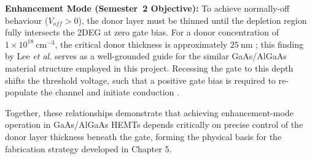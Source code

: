 \vspace{2mm}

\textbf{Enhancement Mode (Semester~2 Objective):}  
To achieve normally-off behaviour ($V_{off} > 0$), the donor layer must
be thinned until the depletion region fully intersects the 2DEG at zero
gate bias. For a donor concentration of \(1\times 10^{18}~\text{cm}^{-3}\), 
the critical donor thickness is approximately \(25~\text{nm}\) \cite{ivcv-hemt}; 
this finding by Lee \textit{et al.} serves as a well-grounded guide for the similar 
GaAs/AlGaAs material structure employed in this project. Recessing the gate to this depth shifts
the threshold voltage, such that a positive
gate bias is required to re-populate the channel and initiate
conduction \cite{Saitto2006}.

\vspace{2mm}

Together, these relationships demonstrate that achieving
enhancement-mode operation in GaAs/AlGaAs HEMTs depends critically on
precise control of the donor layer thickness beneath the gate, forming
the physical basis for the fabrication strategy developed in Chapter 5. 
